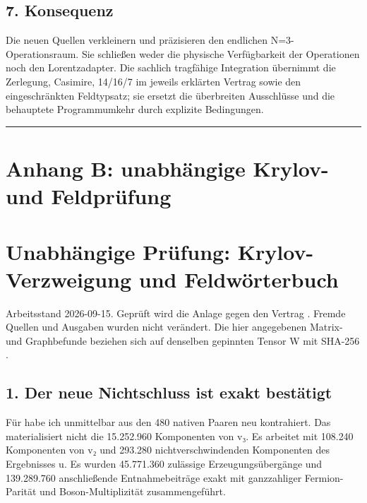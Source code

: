 \subsection{7. Konsequenz}\label{konsequenz}

Die neuen Quellen verkleinern und präzisieren den endlichen
N=3-Operationsraum. Sie schließen weder die physische Verfügbarkeit der
Operationen noch den Lorentzadapter. Die sachlich tragfähige Integration
übernimmt die Zerlegung, Casimire, 14/16/7 im jeweils erklärten Vertrag
sowie den eingeschränkten Feldtypsatz; sie ersetzt die überbreiten
Ausschlüsse und die behauptete Programmumkehr durch explizite
Bedingungen.

\begin{center}\rule{0.5\linewidth}{0.5pt}\end{center}

\section{Anhang B: unabhängige Krylov- und
Feldprüfung}\label{anhang-b-unabhuxe4ngige-krylov--und-feldpruxfcfung}

\section{Unabhängige Prüfung: Krylov-Verzweigung und
Feldwörterbuch}\label{unabhuxe4ngige-pruxfcfung-krylov-verzweigung-und-feldwuxf6rterbuch}

Arbeitsstand 2026-09-15. Geprüft wird die Anlage
 gegen den Vertrag
.
Fremde Quellen und Ausgaben wurden nicht verändert. Die hier angegebenen
Matrix- und Graphbefunde beziehen sich auf denselben gepinnten Tensor W
mit SHA-256
.

\subsection{1. Der neue Nichtschluss ist exakt
bestätigt}\label{der-neue-nichtschluss-ist-exakt-bestuxe4tigt}

Für  habe ich
 unmittelbar aus den 480 nativen Paaren neu
kontrahiert. Das materialisiert nicht die 15.252.960 Komponenten von v₃.
Es arbeitet mit 108.240 Komponenten von v₂ und 293.280
nichtverschwindenden Komponenten des Ergebnisses u. Es wurden 45.771.360
zulässige Erzeugungsübergänge und 139.289.760 anschließende
Entnahmebeiträge exakt mit ganzzahliger Fermion-Parität und
Boson-Multiplizität zusammengeführt.

